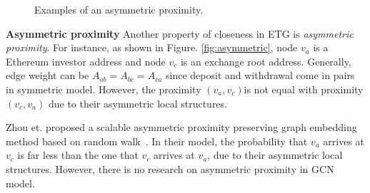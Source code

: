 \begin{figure}[htbp]
	\centering
	\caption{Examples of an asymmetric proximity.}

\end{figure}

\textbf{Asymmetric proximity}
Another property of closeness in ETG is \emph{asymmetric proximity}. For instance, as shown in Figure. \ref{fig:asymmetric}, node $v_a$ is a Ethereum investor address and node $v_c$ is an exchange root address. Generally, edge weight can be $A_{ab}=A_{bc}=A_{ca}$ since deposit and withdrawal come in pairs in symmetric model. However, the proximity $(v_a,v_c)$is not equal with proximity $(v_c,v_a)$ due to their asymmetric local structures.

 Zhou et. proposed a scalable asymmetric proximity preserving graph embedding method based on random walk~\cite{zhou2017scalable}. In their model, the probability that $v_a$ arrives at $v_c$ is far less than the one that $v_c$ arrives at $v_a$, due to their asymmetric local structures. However, there is no research on asymmetric proximity in GCN model.
 








